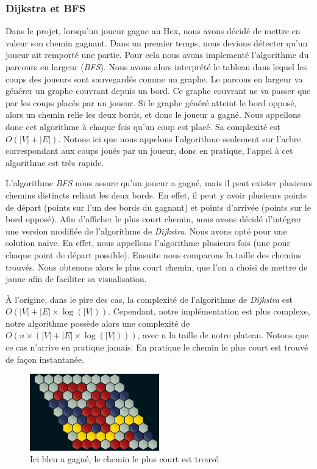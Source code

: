\subsubsection{Dijkstra et BFS}
Dans le projet, lorsqu'un joueur gagne au Hex, nous avons décidé de mettre en valeur son chemin gagnant.
Dans un premier temps, nous devions détecter qu'un joueur ait remporté une partie. Pour cela nous avons implementé l'algorithme du parcours
en largeur (\emph{BFS}). Nous avons alors interprété le tableau dans lequel les coups des joueurs sont sauvegardés comme un graphe. Le parcous en largeur
va générer un graphe couvrant depuis un bord. Ce graphe couvrant ne va passer que par les coups placés par un joueur. Si le graphe généré atteint le bord opposé,
alors un chemin relie les deux bords, et donc le joueur a gagné. Nous appellons donc cet algorithme à chaque fois qu'un coup est placé. Sa complexité est $O(\lvert V \rvert + \lvert E \rvert)$.
Notons ici que nous appelons l'algorithme seulement sur l'arbre correspondant aux coups joués par un joueur, donc en pratique, l'appel à cet algorithme
est très rapide.

L'algorithme \emph{BFS} nous assure qu'un joueur a gagné, mais il peut exister plusieurs chemins distincts reliant les deux bords. En effet,
il peut y avoir plusieurs points de départ (points sur l'un des bords du gagnant) et points d'arrivée (points sur le bord opposé).
Afin d'afficher le plus court chemin, nous avons décidé d'intégrer une version modifiée de l'algorithme de \emph{Dijkstra}.
Nous avons opté pour une solution naïve. En effet, nous appellons l'algorithme plusieurs fois (une pour chaque point de départ possible).
Ensuite nous comparons la taille des chemins trouvés. Nous obtenons alors le plus court chemin, que l'on a choisi de mettre de jaune 
afin de faciliter sa visualisation.

À l'origine, dans le pire des cas, la complexité de l'algorithme de \emph{Dijkstra} est $O(\lvert V \rvert + \lvert E \rvert \times \log(\lvert V \rvert))$.
Cependant, notre implémentation est plus complexe, notre algorithme possède alors une complexité de $O(n \times (\lvert V \rvert+ \lvert E \rvert\times \log(\lvert V \rvert)))$, avec n la taille de notre plateau.
Notons que ce cas n'arrive en pratique jamais. En pratique le chemin le plus court est trouvé de façon instantanée.

\begin{figure}[h]
    \begin{center}
        \includegraphics[width=0.5\textwidth]{root/chemin_gagnant.png}
    \end{center}
    \caption{Ici bleu a gagné, le chemin le plus court est trouvé}\label{fig:chemin_gagnant}
\end{figure}